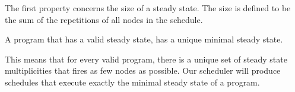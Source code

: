 
The first property concerns the size of a steady state.  The size is
defined to be the sum of the repetitions of all nodes in the schedule.

\begin{theorem}
A {\StreamIt} program that has a valid steady state, has a unique
minimal steady state.
\end{theorem}

This means that for every valid {\StreamIt} program, there is a unique
set of steady state multiplicities that fires as few nodes as
possible.  Our scheduler will produce schedules that execute exactly
the minimal steady state of a program.

